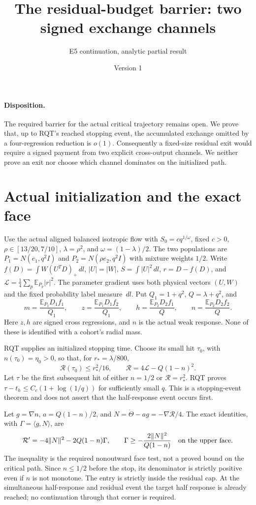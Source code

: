 \documentclass[11pt]{article}
\title{The residual-budget barrier: two signed exchange channels}
\author{E5 continuation, analytic partial result}
\date{Version 1}
\newcommand{\E}{\mathbb E}
\newcommand{\dd}{\,d}
\begin{document}
\maketitle

\paragraph{Disposition.}
The required barrier for the actual critical trajectory remains open.
We prove that, up to RQT's reached stopping event, the accumulated
exchange omitted by a four-regression reduction is $o(1)$.
Consequently a fixed-size residual exit would require a signed payment
from two explicit cross-output channels. We neither prove an exit nor
choose which channel dominates on the initialized path.

\section{Actual initialization and the exact face}
Use the actual aligned balanced isotropic flow with
$S_0=cq^{1/\omega}$, fixed $c>0$, $\rho\in[13/20,7/10]$,
$\lambda=\rho^2$, and $\omega=(1-\lambda)/2$.
The two populations are $P_1=N(e_1,q^2I)$ and
$P_2=N(\rho e_2,q^2I)$ with mixture weights $1/2$.
Write $f(D)=\int W(U^TD)_+\dd l$, $|U|=|W|$,
$S=\int|U|^2\dd l$, $r=D-f(D)$, and
$\mathcal L=\frac14\sum_p\E_{P_p}|r|^2$.
The parameter gradient uses both physical vectors $(U,W)$ and the
fixed probability label measure $\dd l$.
Put $Q_1=1+q^2$, $Q=\lambda+q^2$, and
\[
 m=\frac{\E_{P_1}D_1f_1}{Q_1},\qquad
 z=\frac{\E_{P_1}D_1f_2}{Q_1},\qquad
 h=\frac{\E_{P_2}D_2f_1}{Q},\qquad
 n=\frac{\E_{P_2}D_2f_2}{Q}.
\]
Here $z,h$ are signed cross regressions, and $n$ is the actual weak
response. None of these is identified with a cohort's radial mass.

RQT supplies an initialized stopping time. Choose its small hit
$\tau_0$, with $n(\tau_0)=\eta_0>0$, so that, for
$r_*=\lambda/800$,
\[
 \mathcal R(\tau_0)\le r_*^2/16,\qquad
 \mathcal R=4\mathcal L-Q(1-n)^2.
\]
Let $\tau$ be the first subsequent hit of either $n=1/2$ or
$\mathcal R=r_*^2$. RQT proves $\tau-t_h\le C_c(1+\log(1/q))$
for sufficiently small $q$. This is a stopping-event theorem and
does not assert that the half-response event occurs first.

Let $g=\nabla n$, $a=Q(1-n)/2$, and
$N=\dot\Theta-ag=-\nabla\mathcal R/4$.
The exact identities, with $\Gamma=\langle g,N\rangle$, are
\begin{equation}\label{an04recv1:face}
 \mathcal R'=-4\|N\|^2-2Q(1-n)\Gamma,
 \qquad
 \Gamma\ge-\frac{2\|N\|^2}{Q(1-n)}
 \quad\hbox{on the upper face}.
\end{equation}
The inequality is the required nonoutward face test, not a proved
bound on the critical path. Since $n\le1/2$ before the stop,
its denominator is strictly positive even if $n$ is not monotone.
The entry is strictly inside the residual cap. At the simultaneous
half-response and residual event the target half response is already
reached; no continuation through that corner is required.
\end{document}
